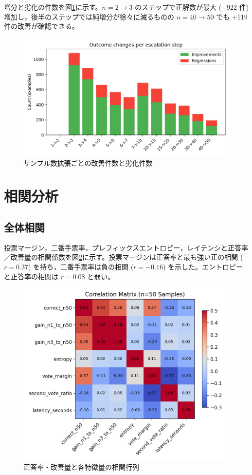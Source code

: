 \documentclass{ipsj}
\begin{document}
増分と劣化の件数を図\ref{fig:gain}に示す。$n=2\rightarrow3$ のステップで正解数が最大 (+922 件) 増加し，後半のステップでは純増分が徐々に減るものの $n=40\rightarrow50$ でも +119 件の改善が確認できる。

\begin{figure}[tb]
  \centering
  \includegraphics[width=0.95\linewidth]{../../figures/n50_batch/gain_loss_per_step.png}
  \caption{サンプル数拡張ごとの改善件数と劣化件数}
  \label{fig:gain}
\end{figure}

\section{相関分析}
\subsection{全体相関}
投票マージン，二番手票率，プレフィックスエントロピー，レイテンシと正答率／改善量の相関係数を図\ref{fig:corr}に示す。投票マージンは正答率と最も強い正の相関 ($r=0.37$) を持ち，二番手票率は負の相関 ($r=-0.16$) を示した。エントロピーと正答率の相関は $r=0.08$ と弱い。

\begin{figure}[tb]
  \centering
  \includegraphics[width=0.95\linewidth]{../../figures/n50_batch/correlation_heatmap.png}
  \caption{正答率・改善量と各特徴量の相関行列}
  \label{fig:corr}
\end{figure}
\end{document}
